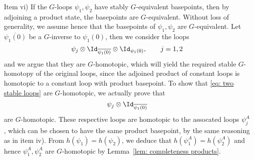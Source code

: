Item vi)  If the $G$-loops $\psi_1,\psi_2$ have stably $G$-equivalent basepoints, then by adjoining a product state, the basepoints are $G$-equivalent. Without loss of generality, we assume hence that the basepoints of 
$\psi_1,\psi_2$ are $G$-equivalent. Let $\overline{\psi_1(0)}$ be a $G$-inverse to $\psi_1(0)$, then we consider the loops
\begin{equation} \label{eq: two stable loops}
	\psi_j \otimes \Id_{\overline{\psi_1(0)}}  \otimes \Id_{\psi_1(0)}, \qquad j=1,2
\end{equation}
and we argue that they are $G$-homotopic, which will yield the required stable $G$-homotopy of the original loops, since the adjoined product of constant loops is homotopic to a constant  loop with product basepoint. 
To show that \eqref{eq: two stable loops} are $G$-homotopic, we actually prove that 
$$
\psi_j \otimes \Id_{\overline{\psi_1(0)}} 
$$
are $G$-homotopic. These respective loops are homotopic to the assocated loops $\psi^A_j$, which can be chosen to have the same product basepoint, by the same reasoning as in item iv).  From $h(\psi_1)=h(\psi_2)$, we deduce that $h(\psi^A_1)=h(\psi^A_2)$ and hence $\psi^A_1,\psi^A_2$ are $G$-homotopic by Lemma~\ref{lem: completeness products}. 

\cleardoublepage

